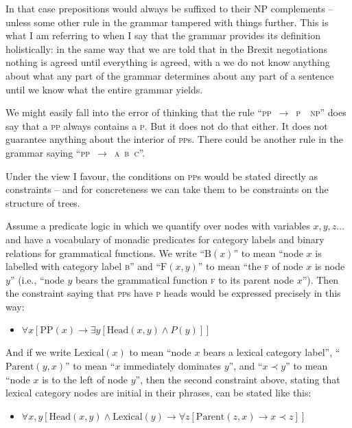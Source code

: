 \documentclass[output=paper]{langscibook}
\begin{document}
In that case prepositions would always be suffixed to their NP complements -- unless some other rule in the grammar tampered with things further. This is what I am referring to when I say that the grammar provides its definition holistically: in the same way that we are told that in the Brexit negotiations nothing is agreed until everything is agreed, with a  we do not know anything about what any part of the grammar determines about any part of a sentence until we know what the entire grammar yields.

We might easily fall into the error of thinking that the rule ``\textsc{pp}~$\rightarrow$~\textsc{p}~~\textsc{np}'' does say that a \textsc{pp} always contains a \textsc{p}.  But it does not do that either. It does not guarantee anything about the interior of \textsc{pp}s. There could be another rule in the grammar saying ``\textsc{pp}~$\rightarrow$~\textsc{a}~\textsc{b}~\textsc{c}''.

Under the view I favour, the conditions on \textsc{pp}s would be stated directly as constraints -- and for concreteness we can take them to be constraints on the structure of trees.

Assume a predicate logic in which we quantify over nodes with variables $x, y, z\ldots$ and have a vocabulary of monadic predicates for category labels and binary relations for grammatical functions.  We write ``$\text{B}(x)$'' to mean ``node $x$ is labelled with category label \textsc{b}'' and ``$\text{F}(x,y)$'' to mean ``the \textsc{f} of node $x$ is node $y$'' (i.e., ``node $y$ bears the grammatical function \textsc{f} to its parent node $x$''). Then the constraint saying that \textsc{pp}s have \textsc{p} heads would be expressed precisely in this way:

\begin{itemize} 
\item[] $\forall x [ \text{PP}(x) \rightarrow                \exists y [ \text{Head}(x,y) \wedge P(y) ] ]$ 
\end{itemize} 

And if we write $\text{Lexical}(x)$ to mean ``node $x$ bears a lexical category label'', ``$\text{Parent}(y,x)$'' to mean ``$x$ immediately dominates $y$'', and ``$x \prec y$'' to mean ``node $x$ is to the left of node $y$'', then the second constraint above, stating that lexical category nodes are initial in their phrases, can be stated like this:

\begin{itemize} 
\item[] $\forall x, y [ \text{Head}(x,y) \wedge \text{Lexical}(y) \rightarrow \forall z [ \text{Parent}(z,x) \rightarrow x \prec z ] ]$ 
\end{itemize}
\end{document}
